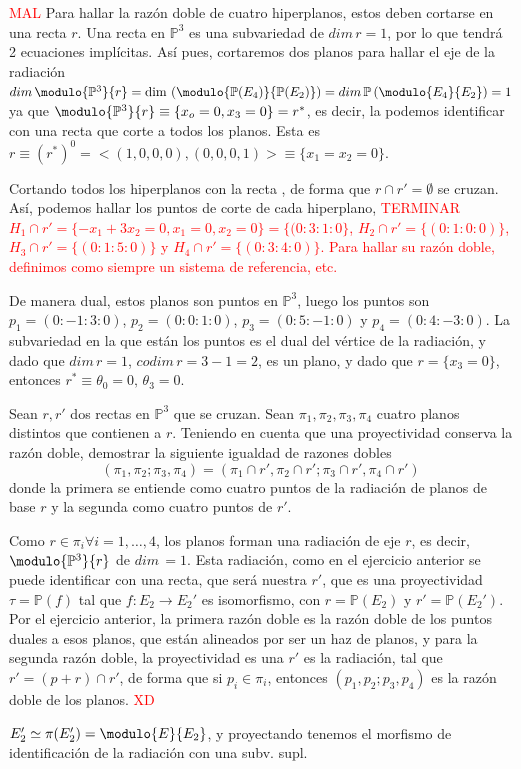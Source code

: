 \begin{sol} \textcolor{red}{MAL}
    Para hallar la raz\'on doble de cuatro hiperplanos, estos deben cortarse en una recta $r$. Una recta en $\mathbb P^3$ es una subvariedad de $dim \, r=1$, por lo que tendr\'a 2 ecuaciones impl\'icitas. As\'i pues, cortaremos dos planos para hallar el eje de la radiaci\'on $dim \, \modulo{\mathbb P^3}{r} = \dim\, \left(\modulo{\mathbb P(E_4)}{\mathbb P(E_2)}\right) = dim \, \mathbb P \left(\modulo{E_4}{E_2} \right) = 1$ ya que $\modulo{\mathbb P^3}{r} \equiv \{x_o=0, x_3=0\} = r^*$, es decir, la podemos identificar con una recta que corte a todos los planos. Esta es $r \equiv (r^*)^0 = <(1,0,0,0),(0,0,0,1)>\equiv \{x_1=x_2=0\}$.
    
    Cortando todos los hiperplanos con la recta , de forma que $r \cap r' = \emptyset$ se cruzan. As\'i, podemos hallar los puntos de corte de cada hiperplano, \textcolor{red}{TERMINAR $H_1 \cap r' = \{-x_1 + 3x_2 = 0, x_1=0, x_2=0\} = \{(0:3:1:0\}$, $H_2 \cap r' = \{(0:1:0:0)\}$, $H_3 \cap r' = \{(0:1:5:0)\}$ y $H_4 \cap r' = \{(0:3:4:0)\}$. Para hallar su raz\'on doble, definimos como siempre un sistema de referencia, etc.}

    De manera dual, estos planos son puntos en $\mathbb P^3$, luego los puntos son $p_1=(0:-1:3:0)$, $p_2=(0:0:1:0)$, $p_3=(0:5:-1:0)$ y $p_4=(0:4:-3:0)$. La subvariedad en la que est\'an los puntos es el dual del v\'ertice de la radiaci\'on, y dado que $dim \, r = 1$, $codim \, r = 3 - 1 = 2$, es un plano, y dado que $r=\{x_3=0\}$, entonces $r^* \equiv \theta_0=0,\, \theta_3=0$.
\end{sol}
\begin{ejer}
    [16] Sean $r, r'$ dos rectas en $\mathbb P^3$ que se cruzan. Sean $\pi_1, \pi_2, \pi_3, \pi_4$ cuatro planos distintos que contienen a $r$. Teniendo en cuenta que una proyectividad conserva la raz\'on doble, demostrar la siguiente igualdad de razones dobles $$
(\pi_1, \pi_2; \pi_3, \pi_4) = (\pi_1\cap r', \pi_2\cap r'; \pi_3\cap r', \pi_4\cap r')$$
donde la primera se entiende como cuatro puntos de la radiaci\'on de planos de base $r$ y la segunda como cuatro puntos de $r'$.
\end{ejer}
\begin{sol}
    Como $r \in \pi_i \forall i =1,\ldots, 4$, los planos forman una radiaci\'on de eje $r$, es decir, $\modulo{\mathbb P^3}{r}$ de $dim \, =1$. Esta radiaci\'on, como en el ejercicio anterior se puede identificar con una recta, que ser\'a nuestra $r'$, que es una proyectividad $\tau=\mathbb P(f)$ tal que $f: E_2 \longrightarrow E_2'$ es isomorfismo, con $r=\mathbb P(E_2)$ y $r'=\mathbb P(E_2')$. Por el ejercicio anterior, la primera raz\'on doble es la raz\'on doble de los puntos duales a esos planos, que est\'an alineados por ser un haz de planos, y para la segunda raz\'on doble, la proyectividad es una $r'$ es la radiaci\'on, tal que $r'=(p+r)\cap r'$, de forma que si $p_i \in \pi_i$, entonces $(p_1,p_2;p_3,p_4)$ es la raz\'on doble de los planos. \textcolor{red}{XD}

    $E_2' \simeq \pi(E_2') = \modulo{E}{E_2}$, y proyectando tenemos el morfismo de identificaci\'on de la radiaci\'on con una subv. supl.
\end{sol}

